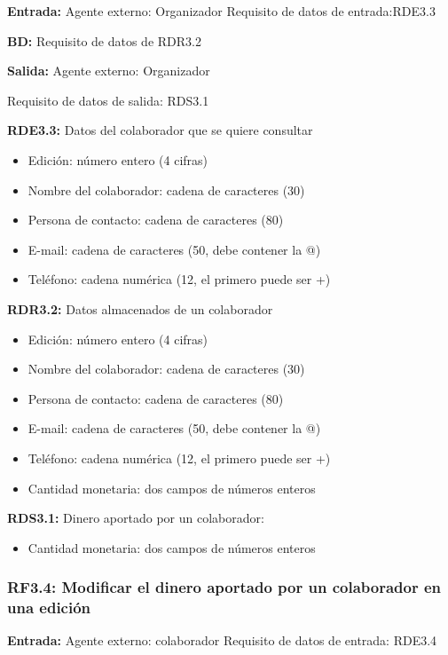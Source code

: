 \textbf{Entrada:} Agente externo: Organizador     Requisito de datos de entrada:RDE3.3

\textbf{BD:} Requisito de datos de RDR3.2

\textbf{Salida:} Agente externo: Organizador

Requisito de datos de salida: RDS3.1

\textbf{RDE3.3:} Datos del colaborador que se quiere consultar
\begin{itemize}
	\item Edición: número entero (4 cifras)
\newline
	\item Nombre del colaborador: cadena de caracteres (30)
	\item Persona de contacto: cadena de caracteres (80)
	\item E-mail: cadena de caracteres (50, debe contener la @)
	\item Teléfono: cadena numérica (12, el primero puede ser +)
\end{itemize}

\textbf{RDR3.2:} Datos almacenados de un colaborador
\begin{itemize}
	\item Edición: número entero (4 cifras)
\newline
	\item Nombre del colaborador: cadena de caracteres (30)
	\item Persona de contacto: cadena de caracteres (80)
	\item E-mail: cadena de caracteres (50, debe contener la @)
	\item Teléfono: cadena numérica (12, el primero puede ser +)
\newline
	\item Cantidad monetaria: dos campos de números enteros
\end{itemize}

\textbf{RDS3.1:} Dinero aportado por un colaborador:
\begin{itemize}
	\item Cantidad monetaria: dos campos de números enteros
\end{itemize}

\subsubsection{RF3.4: Modificar el dinero aportado por un colaborador en una edición}

\textbf{Entrada:} Agente externo: colaborador    Requisito de datos de entrada: RDE3.4

